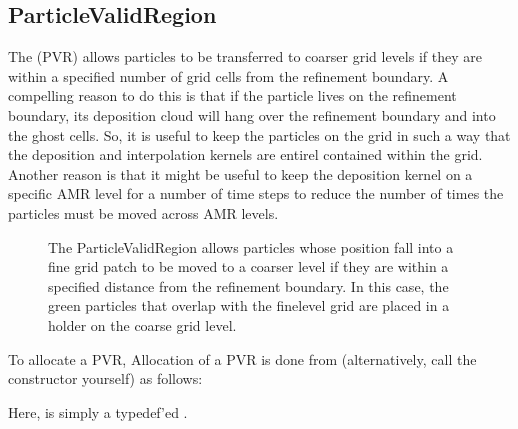 \documentclass[letterpaper,10pt,english]{sphinxmanual}
\let\sphinxpxdimen\pdfpxdimen\else\newdimen\sphinxpxdimen
\begin{document}
\subsection{ParticleValidRegion}
\label{\detokenize{ParticleData:particlevalidregion}}
The  (PVR) allows particles to be transferred to coarser grid levels if they are within a specified number of grid cells from the refinement boundary.
A compelling reason to do this is that if the particle lives on the refinement boundary, its deposition cloud will hang over the refinement boundary and into the ghost cells.
So, it is useful to keep the particles on the grid in such a way that the deposition and interpolation kernels are entirel contained within the grid.
Another reason is that it might be useful to keep the deposition kernel on a specific AMR level for a number of time steps to reduce the number of times the particles must be moved across AMR levels.

\begin{figure}[htb]
\centering
\capstart

\noindent\sphinxincludegraphics[width=480\sphinxpxdimen]{{pvr}.png}
\caption{The ParticleValidRegion allows particles whose position fall into a fine grid patch to be moved to a coarser level if they are within a specified distance from the refinement boundary. In this case, the green particles that overlap with the fine\sphinxhyphen{}level grid are placed in a  holder on the coarse grid level.}\label{\detokenize{ParticleData:id1}}\end{figure}

To allocate a PVR,
Allocation of a PVR is done from  (alternatively, call the constructor yourself) as follows:

\begin{sphinxVerbatim}[commandchars=\\\{\},formatcom=\scriptsize]
      
\end{sphinxVerbatim}

Here,  is simply a typedef’ed .
\end{document}
